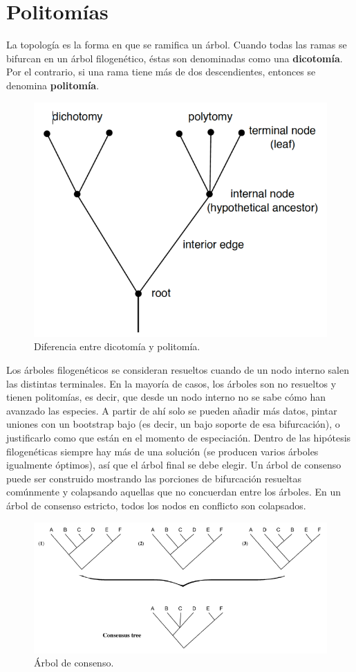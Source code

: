 \section{Politomías}
La topología es la forma en que se ramifica un árbol. Cuando todas las ramas se bifurcan en un árbol filogenético, éstas son denominadas como una \textbf{dicotomía}. Por el contrario, si una rama tiene más de dos descendientes, entonces se denomina \textbf{politomía}.

\begin{figure}[htbp]
\centering
\includegraphics[width=0.3\linewidth]{figs/dichotomy-polytomy.png}
\caption{Diferencia entre dicotomía y politomía.}
\end{figure}

Los árboles filogenéticos se consideran resueltos cuando de un nodo interno salen las distintas terminales. En la mayoría de casos, los árboles son no resueltos y tienen politomías, es decir, que desde un nodo interno no se sabe cómo han avanzado las especies. A partir de ahí solo se pueden añadir más datos, pintar uniones con un bootstrap bajo (es decir, un bajo soporte de esa bifurcación), o justificarlo como que están en el momento de especiación. Dentro de las hipótesis filogenéticas siempre hay más de una solución (se producen varios árboles igualmente óptimos), así que el árbol final se debe elegir. Un árbol de consenso puede ser construido mostrando las porciones de bifurcación resueltas comúnmente y colapsando aquellas que no concuerdan entre los árboles. En un árbol de consenso estricto, todos los nodos en conflicto son colapsados.

\begin{figure}[htbp]
\centering
\includegraphics[width=0.5\linewidth]{figs/consensus-tree.png}
\caption{Árbol de consenso.}
\end{figure}

